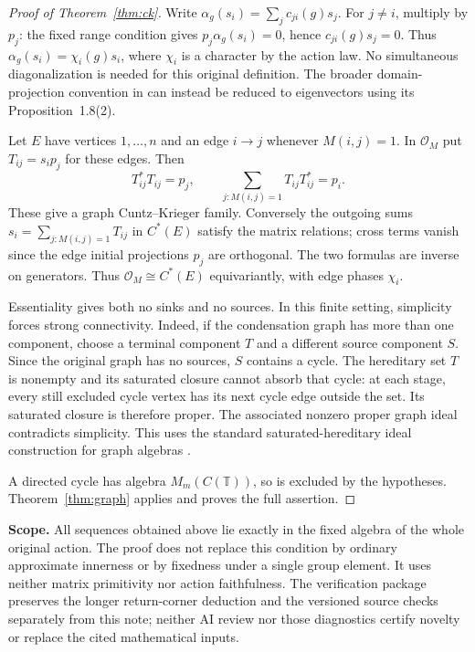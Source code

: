 \documentclass[11pt,a4paper]{article}
\theoremstyle{definition}
\newcommand{\T}{\mathbb T}
\begin{document}
\begin{proof}[Proof of Theorem~\ref{thm:ck}]
Write $\alpha_g(s_i)=\sum_j c_{ji}(g)s_j$. For $j\ne i$, multiply by
$p_j$: the fixed range condition gives
$p_j\alpha_g(s_i)=0$, hence $c_{ji}(g)s_j=0$. Thus
$\alpha_g(s_i)=\chi_i(g)s_i$, where $\chi_i$ is a character by the action
law. No simultaneous diagonalization is needed for this original
definition. The broader domain-projection convention in \cite{BS} can
instead be reduced to eigenvectors using its Proposition~1.8(2).

Let $E$ have vertices $1,\ldots,n$ and an edge $i\to j$ whenever
$M(i,j)=1$. In $\mathcal O_M$ put $T_{ij}=s_ip_j$ for these edges.
Then
\[
 T_{ij}^*T_{ij}=p_j,\qquad
 \sum_{j:M(i,j)=1}T_{ij}T_{ij}^*=p_i.
\]
These give a graph Cuntz--Krieger family. Conversely the outgoing sums
$s_i=\sum_{j:M(i,j)=1}T_{ij}$ in $C^*(E)$ satisfy the matrix relations;
cross terms vanish since the edge initial projections $p_j$ are
orthogonal. The two formulas are inverse on generators. Thus
$\mathcal O_M\cong C^*(E)$ equivariantly, with edge phases $\chi_i$.

Essentiality gives both no sinks and no sources. In this finite setting,
simplicity forces strong connectivity. Indeed, if the condensation graph
has more than one component, choose a terminal component $T$ and a
different source component $S$. Since the original graph has no sources,
$S$ contains a cycle. The hereditary set $T$ is nonempty and its saturated
closure cannot absorb that cycle: at each stage, every still excluded
cycle vertex has its next cycle edge outside the set. Its saturated
closure is therefore proper. The associated nonzero proper graph ideal
contradicts simplicity. This uses the standard saturated-hereditary ideal
construction for graph algebras \cite{KPR}.

A directed cycle has algebra $M_m(C(\T))$, so is excluded by the
hypotheses. Theorem~\ref{thm:graph} applies and proves the full assertion.
\end{proof}

\noindent\textbf{Scope.}
All sequences obtained above lie exactly in the fixed algebra of the
whole original action. The proof does not replace this condition by
ordinary approximate innerness or by fixedness under a single group
element. It uses neither matrix primitivity nor action faithfulness.
The verification package preserves the longer return-corner deduction
and the versioned source checks separately from this note; neither
AI review nor those diagnostics certify novelty or replace the cited
mathematical inputs.
\end{document}
